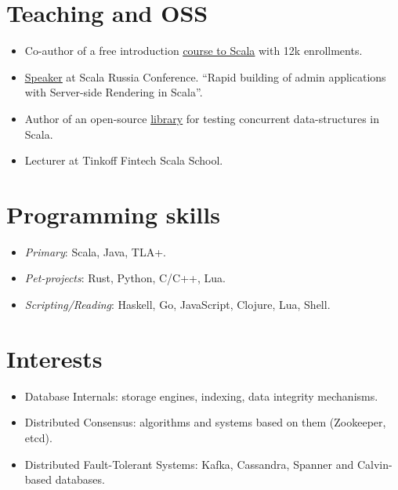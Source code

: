 \documentclass[paper=a4,fontsize=15pt]{scrartcl}
\begin{document}
\section*{Teaching and OSS}{}
\begin{itemize}[noitemsep,leftmargin=20pt,label=\raisebox{0.25ex}{\tiny$\bullet$},topsep=5pt]
  \item Co-author of a free introduction \href{https://stepik.org/course/16243}{\ul{course to Scala}} with 12k enrollments.
  \item \href{https://www.youtube.com/watch?v=8KxWi0xuDKs&t=15s}{\ul{Speaker}} at Scala Russia Conference. ``Rapid building of admin applications with Server-side Rendering in Scala''.
  \item Author of an open-source \href{https://github.com/susliko/lotos}{\ul{library}} for testing concurrent data-structures in Scala.
  \item Lecturer at Tinkoff Fintech Scala School.
\end{itemize}

\section*{Programming skills}{}
\begin{itemize}[noitemsep,leftmargin=20pt,label=\raisebox{0.25ex}{\tiny$\bullet$},topsep=5pt]
    \item \textit{Primary}: Scala, Java, TLA+.
    \item \textit{Pet-projects}: Rust, Python, C/C++, Lua.
    \item \textit{Scripting/Reading}: Haskell, Go, JavaScript, Clojure, Lua, Shell.
\end{itemize}

\section*{Interests}{}
\begin{itemize}[noitemsep,leftmargin=20pt,label=\raisebox{0.25ex}{\tiny$\bullet$},topsep=5pt]
    \item Database Internals: storage engines, indexing, data integrity mechanisms.
    \item Distributed Consensus: algorithms and systems based on them (Zookeeper, etcd).
    \item Distributed Fault-Tolerant Systems: Kafka, Cassandra, Spanner and Calvin-based databases.
\end{itemize}
\end{document}
